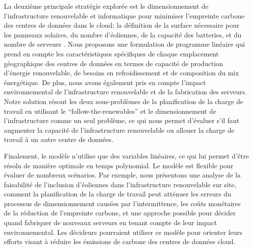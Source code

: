 La deuxième principale stratégie explorée est le dimensionnement de l'infrastructure renouvelable et informatique pour minimiser l'empreinte carbone des centres de données dans le cloud: la définition de la surface nécessaire pour les panneaux solaires, du nombre d'éoliennes, de la capacité des batteries, et du nombre de serveurs . Nous proposons une formulation de programme linéaire qui prend en compte les caractéristiques spécifiques de chaque emplacement géographique des centres de données en termes de capacité de production d'énergie renouvelable, de besoins en refroidissement et de composition du mix énergétique. De plus, nous avons également pris en compte l'impact environnemental de l'infrastructure renouvelable et de la fabrication des serveurs. Notre solution résout les deux sous-problèmes de la planification de la charge de travail en utilisant le ``follow-the-renewables'' et le dimensionnement de l'infrastructure comme un seul problème, ce qui nous permet d'évaluer s'il faut augmenter la capacité de l'infrastructure renouvelable ou allouer la charge de travail à un autre centre de données.

Finalement, le modèle n'utilise que des variables linéaires, ce qui lui permet d'être résolu de manière optimale en temps polynomial. Le modèle est flexible pour évaluer de nombreux scénarios. Par exemple, nous présentons une analyse de la faisabilité de l'inclusion d'éoliennes dans l'infrastructure renouvelable sur site, comment la planification de la charge de travail peut atténuer les erreurs du processus de dimensionnement causées par l'intermittence, les coûts monétaires de la réduction de l'empreinte carbone, et une approche possible pour décider quand fabriquer de nouveaux serveurs en tenant compte de leur impact environnemental. Les décideurs pourraient utiliser ce modèle pour orienter leurs efforts visant à réduire les émissions de carbone des centres de données cloud.